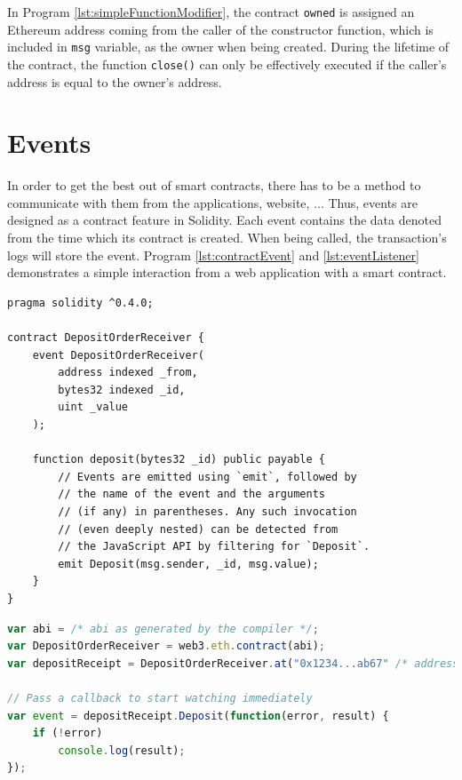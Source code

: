 \documentclass[twoside,numperchapter]{tutthesis} %
\begin{document}
In Program \ref{lst:simpleFunctionModifier}, the contract \texttt{owned} is assigned an Ethereum address coming from the caller of the constructor function, which is included in \texttt{msg} variable, as the owner when being created. During the lifetime of the contract, the function \texttt{close()} can only be effectively executed if the caller's address is equal to the owner's address.

\section{Events}

In order to get the best out of smart contracts, there has to be a method to communicate with them from the applications, website, ... Thus, events are designed as a contract feature in Solidity. Each event contains the data denoted from the time which its contract is created. When being called, the transaction's logs will store the event. Program \ref{lst:contractEvent} and \ref{lst:eventListener} demonstrates a simple interaction from a web application with a smart contract.

\begin{lstlisting}[float,caption={Contract with Event derived from \citep{SolidityDocumentation}.},label={lst:contractEvent},language=Solidity]
pragma solidity ^0.4.0;

contract DepositOrderReceiver {
    event DepositOrderReceiver(
        address indexed _from,
        bytes32 indexed _id,
        uint _value
    );

    function deposit(bytes32 _id) public payable {
        // Events are emitted using `emit`, followed by
        // the name of the event and the arguments
        // (if any) in parentheses. Any such invocation
        // (even deeply nested) can be detected from
        // the JavaScript API by filtering for `Deposit`.
        emit Deposit(msg.sender, _id, msg.value);
    }
}
\end{lstlisting}

\begin{lstlisting}[float,caption={Listening to Event from web applications \citep{SolidityDocumentation}.},label={lst:eventListener},language=JavaScript]
var abi = /* abi as generated by the compiler */;
var DepositOrderReceiver = web3.eth.contract(abi);
var depositReceipt = DepositOrderReceiver.at("0x1234...ab67" /* address */);

// Pass a callback to start watching immediately
var event = depositReceipt.Deposit(function(error, result) {
    if (!error)
        console.log(result);
});
\end{lstlisting}
\end{document}

